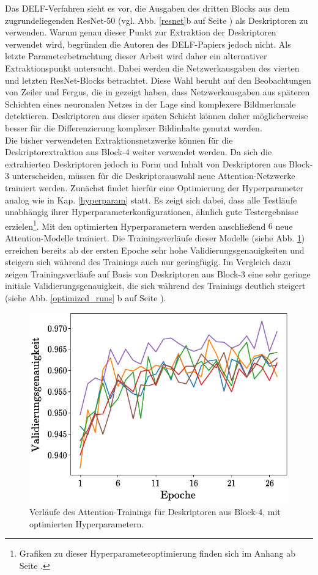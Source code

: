 Das DELF-Verfahren sieht es vor, die Ausgaben des dritten Blocks aus dem zugrundeliegenden ResNet-50 (vgl. Abb. \ref{resnet}b auf Seite \pageref{resnet}) als Deskriptoren zu verwenden. Warum genau dieser Punkt zur Extraktion der Deskriptoren verwendet wird, begründen die Autoren des DELF-Papiers \cite{delf} jedoch nicht. Als letzte Parameterbetrachtung dieser Arbeit wird daher ein alternativer Extraktionspunkt untersucht. Dabei werden die Netzwerkausgaben des vierten und letzten ResNet-Blocks betrachtet. Diese Wahl beruht auf den Beobachtungen von Zeiler und Fergus, die in \cite{extraction_point_meaning} gezeigt haben, dass Netzwerkausgaben aus späteren Schichten eines neuronalen Netzes in der Lage sind komplexere Bildmerkmale detektieren. Deskriptoren aus dieser späten Schicht können daher möglicherweise besser für die Differenzierung komplexer Bildinhalte genutzt werden.
\\
Die bisher verwendeten Extraktionsnetzwerke können für die Deskriptorextraktion aus Block-4 weiter verwendet werden. Da sich die extrahierten Deskriptoren jedoch in Form und Inhalt von Deskriptoren aus Block-3 unterscheiden, müssen für die Deskriptorauswahl neue Attention-Netzwerke trainiert werden. Zunächst findet hierfür eine Optimierung der Hyperparameter analog wie in Kap. \ref{hyperparam} statt. Es zeigt sich dabei, dass alle Testläufe unabhängig ihrer Hyperparameterkonfigurationen, ähnlich gute Testergebnisse erzielen\footnote{Grafiken zu dieser Hyperparameteroptimierung finden sich im Anhang ab Seite \pageref{hyperopt_layer4}.}. Mit den optimierten Hyperparametern werden anschließend $6$ neue Attention-Modelle trainiert. Die Trainingsverläufe dieser Modelle (siehe Abb. \ref{optimized_runs_layer4}) erreichen bereits ab der ersten Epoche sehr hohe Validierungsgenauigkeiten und steigern sich während des Trainings auch nur geringfügig. Im Vergleich dazu zeigen Trainingsverläufe auf Basis von Deskriptoren aus Block-3 eine sehr geringe initiale Validierungsgenauigkeit, die sich während des Trainings deutlich steigert (siehe Abb. \ref{optimized_runs} b auf Seite \pageref{optimized_runs}). 
\begin{figure}[h]
\centering
\includegraphics[scale=1]{NNOPT/6_model_verlauf_layer4}
\caption{Verläufe des Attention-Trainings für Deskriptoren aus Block-4, mit optimierten Hyperparametern.}
\label{optimized_runs_layer4}
\end{figure}
